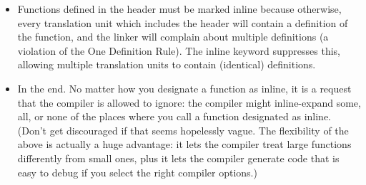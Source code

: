 \documentclass[a4paper,11pt,twoside]{book}
\begin{document}
\begin{itemize}
	\item Functions defined in the header must be marked inline because otherwise, every translation unit which includes the header will contain a definition of the function, and the linker will complain about multiple definitions (a violation of the One Definition Rule). The inline keyword suppresses this, allowing multiple translation units to contain (identical) definitions.
	
	\item In the end. No matter how you designate a function as inline, it is a request that the compiler is allowed to ignore: the compiler might inline-expand some, all, or none of the places where you call a function designated as inline. (Don’t get discouraged if that seems hopelessly vague. The flexibility of the above is actually a huge advantage: it lets the compiler treat large functions differently from small ones, plus it lets the compiler generate code that is easy to debug if you select the right compiler options.)
\end{itemize}
\end{document}
